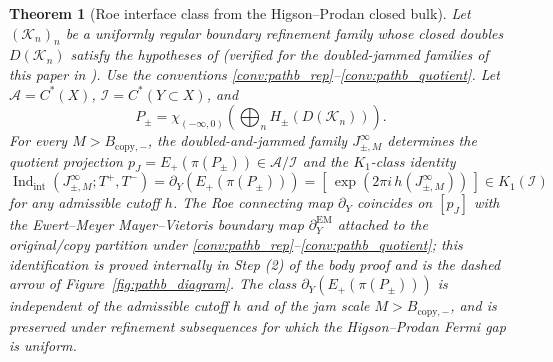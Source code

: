 \documentclass[11pt]{article}
\numberwithin{equation}{section}
\newtheorem{theorem}{Theorem}[section]
\theoremstyle{definition}
\theoremstyle{remark}
\newcommand{\K}{\mathcal{K}}
\newcommand{\Indint}{\operatorname{Ind}_{\mathrm{int}}}
\begin{document}
\begin{theorem}[Roe interface class from the Higson--Prodan closed bulk]\label{thm:pathb_roe_winding}
Let \((\K_n)_n\) be a uniformly regular boundary refinement family whose closed doubles
\(D(\K_n)\) satisfy the hypotheses of  (verified for the doubled-jammed
families of this paper in ). Use the conventions
\ref{conv:pathb_rep}--\ref{conv:pathb_quotient}. Let \(\mathcal A=C^*(X)\),
\(\mathcal I=C^*(Y\subset X)\), and
\[
P_\pm=\chi_{(-\infty,0)}\!\left(\bigoplus_n H_\pm(D(\K_n))\right).
\]
For every \(M>B_{\mathrm{copy},-}\), the doubled-and-jammed family \(J_{\pm,M}^\infty\)
determines the quotient projection \(p_J=E_+(\pi(P_\pm))\in\mathcal A/\mathcal I\) and the
\(K_1\)-class identity
\[
\Indint(J_{\pm,M}^\infty;T^+,T^-)
=
\partial_Y(E_+(\pi(P_\pm)))
=
[\,\exp(2\pi i\,h(J_{\pm,M}^\infty))\,]\in K_1(\mathcal I)
\]
for any admissible cutoff \(h\). The Roe connecting map \(\partial_Y\) coincides on
\([p_J]\) with the Ewert--Meyer Mayer--Vietoris boundary map \(\partial^{\mathrm{EM}}_Y\)
attached to the original/copy partition under
\ref{conv:pathb_rep}--\ref{conv:pathb_quotient}; this identification is proved internally in
Step (2) of the body proof and is the dashed arrow of Figure~\ref{fig:pathb_diagram}. The
class \(\partial_Y(E_+(\pi(P_\pm)))\) is independent of the admissible cutoff \(h\) and of
the jam scale \(M>B_{\mathrm{copy},-}\), and is preserved under refinement subsequences for
which the Higson--Prodan Fermi gap is uniform.
\end{theorem}
\end{document}
